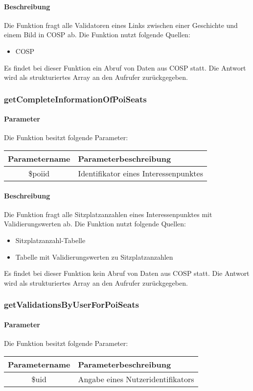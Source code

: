 \paragraph{Beschreibung} Die Funktion fragt alle Validatoren eines Links zwischen einer Geschichte und einem Bild in {\glqq COSP\grqq} ab. Die Funktion nutzt folgende Quellen:
\begin{itemize}
	\item COSP
\end{itemize}
Es findet bei dieser Funktion ein Abruf von Daten aus {\glqq COSP\grqq} statt. Die Antwort wird als strukturiertes Array an den Aufrufer zurückgegeben.
\subsubsection{getCompleteInformationOfPoiSeats}
\paragraph{Parameter} Die Funktion besitzt folgende Parameter:
\begin{table}[H]
	\begin{tabular}{|c|p{11cm}|}
		\hline
		\textbf{Parametername} & \textbf{Parameterbeschreibung} \\ \hline
		\$poiid      & Identifikator eines Interessenpunktes \\ \hline
	\end{tabular}
\end{table}
\paragraph{Beschreibung} Die Funktion fragt alle Sitzplatzanzahlen eines Interessenpunktes mit Validierungswerten ab. Die Funktion nutzt folgende Quellen:
\begin{itemize}
	\item Sitzplatzanzahl-Tabelle
	\item Tabelle mit Validierungswerten zu Sitzplatzanzahlen
\end{itemize}
Es findet bei dieser Funktion kein Abruf von Daten aus {\glqq COSP\grqq} statt. Die Antwort wird als strukturiertes Array an den Aufrufer zurückgegeben.
\subsubsection{getValidationsByUserForPoiSeats}
\paragraph{Parameter} Die Funktion besitzt folgende Parameter:
\begin{table}[H]
	\begin{tabular}{|c|p{11cm}|}
		\hline
		\textbf{Parametername} & \textbf{Parameterbeschreibung} \\ \hline
		\$uid & Angabe eines Nutzeridentifikators \\ \hline
	\end{tabular}
\end{table}
